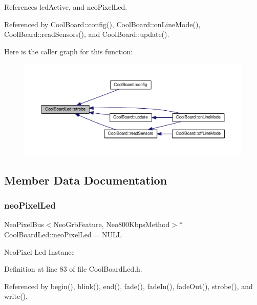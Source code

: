 References led\+Active, and neo\+Pixel\+Led.



Referenced by Cool\+Board\+::config(), Cool\+Board\+::on\+Line\+Mode(), Cool\+Board\+::read\+Sensors(), and Cool\+Board\+::update().

Here is the caller graph for this function\+:
\nopagebreak
\begin{figure}[H]
\begin{center}
\leavevmode
\includegraphics[width=350pt]{de/dc0/class_cool_board_led_ad5f0de4c628cbfbf49896042831c64ad_icgraph}
\end{center}
\end{figure}


\subsection{Member Data Documentation}
\mbox{\label{class_cool_board_led_ac2c13fa462a010cd9242bf297c013923}} 
\subsubsection{\texorpdfstring{neo\+Pixel\+Led}{neoPixelLed}}
{\footnotesize\ttfamily Neo\+Pixel\+Bus$<$Neo\+Grb\+Feature, Neo800\+Kbps\+Method$>$$\ast$ Cool\+Board\+Led\+::neo\+Pixel\+Led = N\+U\+LL\hspace{0.3cm}{\ttfamily [private]}}

Neo\+Pixel Led Instance 

Definition at line 83 of file Cool\+Board\+Led.\+h.



Referenced by begin(), blink(), end(), fade(), fade\+In(), fade\+Out(), strobe(), and write().

\mbox{\label{class_cool_board_led_aadd04d2ecf123247718d77f42fba7f08}} 
